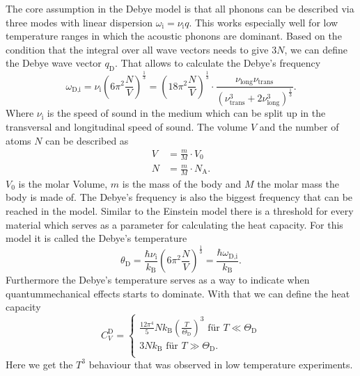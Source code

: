 The core assumption in the Debye model is that all phonons can be described via three modes with linear dispersion $\omega_\text{i} = \nu_\text{i} q$.
This works especially well for low temperature ranges in which the acoustic phonons are dominant.
Based on the condition that the integral over all wave vectors needs to give $3N$, we can define the Debye wave vector $q_\text{D}$.
That allows to calculate the Debye's frequency
\begin{equation}
    \omega_\text{D,i} = \nu_\text{i} \left(6 \pi^2 \frac{N}{V} \right)^{\frac{1}{3}} = \left(18 \pi^2 \frac{N}{V} \right)^{\frac{1}{3}} \cdot \frac{\nu_\text{long} \nu_\text{trans}}{\left( \nu_\text{trans}^3 +  2 \nu_\text{long}^3  \right)^{\frac{1}{3}}}.
    \label{eq:debye_freq}
\end{equation}
Where $\nu_\text{i}$ is the speed of sound in the medium which can be split up in the transversal and longitudinal speed of sound.
The volume $V$ and the number of atoms $N$ can be described as
\begin{align}
    V &= \frac{m}{M} \cdot V_0\\ 
    N &= \frac{m}{M} \cdot N_\text{A}.
\end{align}
$V_0$ is the molar Volume, $m$ is the mass of the body and $M$ the molar mass the body is made of.
The Debye's frequency is also the biggest frequency that can be reached in the model.
Similar to the Einstein model there is a threshold for every material which serves as a parameter for calculating the heat capacity.
For this model it is called the Debye's temperature
\begin{equation}
    \theta_\text{D} = \frac{\hbar \nu_\text{i}}{k_\text{B}} \left(6 \pi^2 \frac{N}{V} \right)^{\frac{1}{3}} = \frac{\hbar \omega_\text{D,i}}{k_\text{B}}.
    \label{eq:debye_temp}
\end{equation}
Furthermore the Debye's temperature serves as a way to indicate when quantummechanical effects starts to dominate. 
With that we can define the heat capacity
\begin{equation}
    C_V^\text{D} =
      \begin{cases}
        \frac{12 \pi ^4}{5} N k_\text{B} \left( \frac{T}{\Theta_\text{D}}   \right)^3 \,\, \text{für} \,\,  T \ll \Theta_\text{D}\\
        3 N k_\text{B} \,\, \text{für} \,\, T \gg \Theta_\text{D}.\\
        \end{cases}
        \label{eq:debyec}
\end{equation}
Here we get the $T^3$ behaviour that was observed in low temperature experiments.